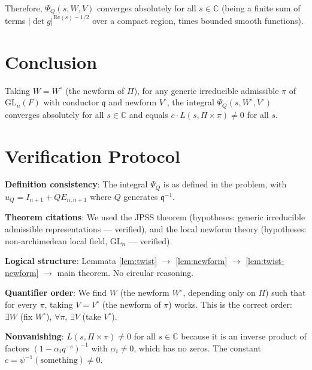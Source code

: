 \documentclass[12pt]{article}
\begin{document}
Therefore, $\Psi_Q(s, W, V)$ converges absolutely for all $s \in \mathbb{C}$ (being a finite sum of terms $|\det g|^{\mathrm{Re}(s)-1/2}$ over a compact region, times bounded smooth functions).

\section{Conclusion}

Taking $W = W^\circ$ (the newform of $\Pi$), for any generic irreducible admissible $\pi$ of $\mathrm{GL}_n(F)$ with conductor $\mathfrak{q}$ and newform $V^\circ$, the integral $\Psi_Q(s, W^\circ, V^\circ)$ converges absolutely for all $s \in \mathbb{C}$ and equals $c \cdot L(s, \Pi \times \pi) \neq 0$ for all $s$.

\section{Verification Protocol}

\textbf{Definition consistency}: The integral $\Psi_Q$ is as defined in the problem, with $u_Q = I_{n+1} + QE_{n,n+1}$ where $Q$ generates $\mathfrak{q}^{-1}$.

\textbf{Theorem citations}: We used the JPSS theorem \cite{JPSS1983} (hypotheses: generic irreducible admissible representations — verified), and the local newform theory \cite{Jacquet2012,Nelson2020} (hypotheses: non-archimedean local field, $\mathrm{GL}_n$ — verified).

\textbf{Logical structure}: Lemmata \ref{lem:twist} $\to$ \ref{lem:newform} $\to$ \ref{lem:twist-newform} $\to$ main theorem. No circular reasoning.

\textbf{Quantifier order}: We find $W$ (the newform $W^\circ$, depending only on $\Pi$) such that for every $\pi$, taking $V = V^\circ$ (the newform of $\pi$) works. This is the correct order: $\exists W$ (fix $W^\circ$), $\forall \pi$, $\exists V$ (take $V^\circ$).

\textbf{Nonvanishing}: $L(s, \Pi \times \pi) \neq 0$ for all $s \in \mathbb{C}$ because it is an inverse product of factors $(1-\alpha_i q^{-s})^{-1}$ with $\alpha_i \neq 0$, which has no zeros. The constant $c = \psi^{-1}(\text{something}) \neq 0$.
\end{document}
